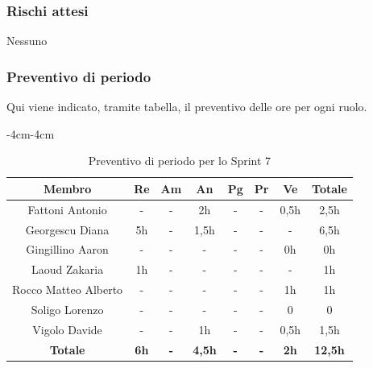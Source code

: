 \documentclass[a4paper,12pt]{article}
\begin{document}
\subsubsection{Rischi attesi}
Nessuno

\subsubsection{Preventivo di periodo}
Qui viene indicato, tramite tabella, il preventivo delle ore per ogni ruolo.

\begin{table}[H]
    \begin{adjustwidth}{-4cm}{-4cm}
    \centering
    \begin{tabular}{|c|c|c|c|c|c|c|c|}
        \hline
        \textbf{Membro} & \textbf{Re} & \textbf{Am} & \textbf{An} & \textbf{Pg} & \textbf{Pr} & \textbf{Ve} & \textbf{Totale} \\
        \hline
        Fattoni Antonio      & -  & - & 2h & - & - & 0,5h & 2,5h \\
        \hline
        Georgescu Diana      & 5h & - & 1,5h & - & - & - & 6,5h \\
        \hline
        Gingillino Aaron     & -  & - & -    & - & - & 0h & 0h \\
        \hline
        Laoud Zakaria        & 1h  & - & -    & - & - & - & 1h \\
        \hline
        Rocco Matteo Alberto & -  & - & -    & - & - & 1h & 1h \\
        \hline
        Soligo Lorenzo       & -  & - & -    & - & - & 0 & 0 \\
        \hline
        Vigolo Davide        & -  & - & 1h    & - & - & 0,5h & 1,5h \\
        \hline
        \textbf{Totale} & \textbf{6h} & \textbf{-} & \textbf{4,5h} & \textbf{-} & \textbf{-} & \textbf{2h} & \textbf{12,5h} \\
        \hline
    \end{tabular}
    \caption{Preventivo di periodo per lo Sprint 7}
    \end{adjustwidth}
\end{table}
\end{document}
